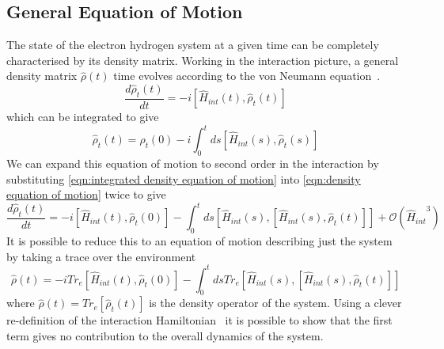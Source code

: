 
\subsection{General Equation of Motion}
The state of the electron hydrogen
system at a given time can be completely
characterised by its density
matrix.
Working in the interaction
picture, a general density matrix
\(\hat{\rho}(t)\) time evolves according
to the von Neumann equation~\cite{TP2_Notes}.
\begin{equation}
    \frac{d\hat{\rho}_t(t)}{dt} =
    -i [\hat{H}_{int}(t), \hat{\rho}_t(t)]
    \label{eqn:density equation of motion}
\end{equation}
which can be integrated to give
\begin{equation}
    \hat{\rho}_t(t) =
    \hat{\rho}_t(0)
    - i \int_0^t ds
        [\hat{H}_{int}(s), \hat{\rho}_t(s)]
    \label{eqn:integrated density equation of motion}
\end{equation}
We can expand this equation of motion
to second order in the interaction
by substituting \cref{eqn:integrated density equation of motion}
into \cref{eqn:density equation of motion}
twice to give
\begin{equation}
    \frac{d\hat{\rho}_t(t)}{dt} =
    -i [\hat{H}_{int}(t), \hat{\rho}_t(0)]
    - \int_0^t ds
        [\hat{H}_{int}(s),
            [\hat{H}_{int}(s), \hat{\rho}_t(t)]]
    +\mathcal{O}({\hat{H}_{int}}^3)
\end{equation}
It is possible to reduce this to
an equation of motion
describing just the system by taking
a trace over the environment~\cite{Manzano_2020}
\begin{equation}
    \hat{\rho}(t) =
    -i Tr_e[\hat{H}_{int}(t), \hat{\rho}_t(0)]
    - \int_0^t ds
    Tr_e[\hat{H}_{int}(s),
    [\hat{H}_{int}(s), \hat{\rho}_t(t)]]
    \label{eqn:density motion before redfield approximation}
\end{equation}
where \(\hat{\rho}(t) = Tr_e[\hat{\rho}_t(t)]\)
is the density operator of the system.
Using a clever re-definition of the interaction
Hamiltonian~\cite{Manzano_2020} it
is possible to show that the first
term gives no contribution to the
overall dynamics of the system.

